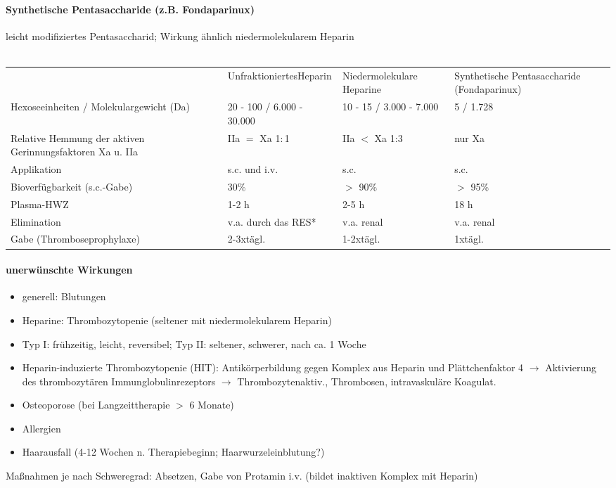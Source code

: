 \documentclass[10pt,a4paper]{report}
\begin{document}
\paragraph{Synthetische Pentasaccharide (z.B. Fondaparinux)} %
\label{par:synthetische_pentasaccharide_z_b_fondaparinux_}
leicht modifiziertes Pentasaccharid; Wirkung ähnlich niedermolekularem Heparin \\ \\
\begin{tabularx}{\textwidth}{XXXX}
&UnfraktioniertesHeparin&Niedermolekulare Heparine&Synthetische Pentasaccharide (Fondaparinux)\\
Hexoseeinheiten / Molekulargewicht (Da)&20 - 100 / 6.000 - 30.000&10 - 15 / 3.000 - 7.000&5 / 1.728 \\
Relative Hemmung der aktiven Gerinnungsfaktoren Xa u. IIa&IIa $=$ Xa 1$:$1&IIa $<$ Xa 1:3&nur Xa \\
Applikation&s.c. und i.v.&s.c.&s.c.\\
Bioverfügbarkeit (s.c.-Gabe)&30\%&$>$ 90\%&$>$ 95\%\\
Plasma-HWZ&1-2 h&2-5 h&18 h\\
Elimination&v.a. durch das RES*&v.a. renal&v.a. renal\\
Gabe (Thromboseprophylaxe)&2-3xtägl.&1-2xtägl.&1xtägl.\\
\end{tabularx}
\paragraph{unerwünschte Wirkungen} %
\label{par:unerw_nschte_wirkungen}
\begin{itemize}
	\item generell: Blutungen
	\item Heparine:	Thrombozytopenie (seltener mit niedermolekularem Heparin)
	\item Typ I:  frühzeitig, leicht, reversibel; Typ II: seltener, schwerer, nach ca. 1 Woche
	\item Heparin-induzierte Thrombozytopenie (HIT): Antikörperbildung gegen Komplex aus Heparin und Plättchenfaktor 4 $\rightarrow$ Aktivierung des thrombozytären Immunglobulinrezeptors $\rightarrow$ Thrombozytenaktiv., Thrombosen, intravaskuläre Koagulat.
	\item Osteoporose (bei Langzeittherapie $>$ 6 Monate)  
	\item Allergien 
	\item Haarausfall (4-12 Wochen n. Therapiebeginn; Haarwurzeleinblutung?)
\end{itemize}
Maßnahmen je nach Schweregrad: Absetzen, Gabe von Protamin i.v. (bildet inaktiven Komplex mit Heparin)
\end{document}
